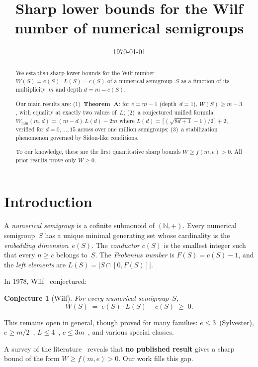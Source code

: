 \documentclass[11pt,a4paper]{amsart}
\title{Sharp lower bounds for the Wilf number of numerical semigroups}
\author{}
\date{\today}
\newtheorem{conjecture}[theorem]{Conjecture}
\theoremstyle{definition}
\theoremstyle{remark}
\begin{document}
\begin{abstract}
We establish sharp lower bounds for the Wilf number
$W(S) = e(S)\cdot L(S) - c(S)$
of a numerical semigroup~$S$ as a function of its multiplicity~$m$
and depth $d = m - e(S)$.

Our main results are:
(1)~\textbf{Theorem~A}: for $e = m-1$ (depth~$d=1$),
$W(S) \ge m - 3$, with equality at exactly two values of~$L$;
(2)~a conjectured unified formula
$W_{\min}(m,d) = (m-d)\,L(d) - 2m$
where $L(d) = \lceil(\sqrt{8d+1}-1)/2\rceil + 2$,
verified for $d = 0,\dots,15$ across over one million semigroups;
(3)~a stabilization phenomenon governed by Sidon-like conditions.

To our knowledge, these are the first quantitative sharp bounds
$W \ge f(m,e) > 0$.  All prior results prove only $W \ge 0$.
\end{abstract}

\maketitle

\section{Introduction}\label{sec:intro}

A \emph{numerical semigroup} is a cofinite submonoid of $(\mathbb{N},+)$.
Every numerical semigroup~$S$ has a unique minimal generating set whose
cardinality is the \emph{embedding dimension}~$e(S)$.  The
\emph{conductor} $c(S)$ is the smallest integer such that every
$n \ge c$ belongs to~$S$.  The \emph{Frobenius number} is
$F(S) = c(S)-1$, and the \emph{left elements} are
$L(S) = |S \cap [0, F(S)]|$.

In 1978, Wilf~\cite{wilf1978} conjectured:

\begin{conjecture}[Wilf]
For every numerical semigroup~$S$,
\[
  W(S) \;=\; e(S)\cdot L(S) - c(S) \;\ge\; 0.
\]
\end{conjecture}

This remains open in general, though proved for many families:
$e \le 3$~(Sylvester), $e \ge m/2$~\cite{sammartano2012},
$L \le 4$~\cite{bruns2019}, $c \le 3m$~\cite{eliahou2018}, and
various special classes.

A survey of the literature~\cite{delgado2019,moscariello2020} reveals
that \textbf{no published result} gives a sharp bound of the form
$W \ge f(m,e) > 0$.  Our work fills this gap.
\end{document}
